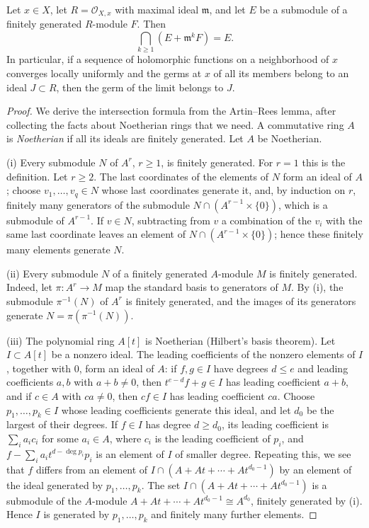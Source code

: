 \begin{lemma}\label{lem:analytic-krull-closure}
Let $x\in X$, let $R=\mathcal O_{X,x}$ with maximal ideal $\mathfrak m$, and let $E$ be a submodule of a finitely generated $R$-module $F$. Then
\[
 \bigcap_{k\geq1}(E+\mathfrak m^kF)=E.
\]
In particular, if a sequence of holomorphic functions on a neighborhood of $x$ converges locally uniformly and the germs at $x$ of all its members belong to an ideal $J\subset R$, then the germ of the limit belongs to $J$.
\end{lemma}
\begin{proof}
We derive the intersection formula from the Artin--Rees lemma, after collecting the facts about Noetherian rings that we need. A commutative ring $A$ is \emph{Noetherian} if all its ideals are finitely generated. Let $A$ be Noetherian.

(i) Every submodule $N$ of $A^r$, $r\geq1$, is finitely generated. For $r=1$ this is the definition. Let $r\geq2$. The last coordinates of the elements of $N$ form an ideal of $A$; choose $v_1,\ldots,v_q\in N$ whose last coordinates generate it, and, by induction on $r$, finitely many generators of the submodule $N\cap(A^{r-1}\times\{0\})$, which is a submodule of $A^{r-1}$. If $v\in N$, subtracting from $v$ a combination of the $v_i$ with the same last coordinate leaves an element of $N\cap(A^{r-1}\times\{0\})$; hence these finitely many elements generate $N$.

(ii) Every submodule $N$ of a finitely generated $A$-module $M$ is finitely generated. Indeed, let $\pi\colon A^r\to M$ map the standard basis to generators of $M$. By (i), the submodule $\pi^{-1}(N)$ of $A^r$ is finitely generated, and the images of its generators generate $N=\pi(\pi^{-1}(N))$.

(iii) The polynomial ring $A[t]$ is Noetherian (Hilbert's basis theorem). Let $I\subset A[t]$ be a nonzero ideal. The leading coefficients of the nonzero elements of $I$, together with $0$, form an ideal of $A$: if $f,g\in I$ have degrees $d\leq e$ and leading coefficients $a,b$ with $a+b\neq0$, then $t^{e-d}f+g\in I$ has leading coefficient $a+b$, and if $c\in A$ with $ca\neq0$, then $cf\in I$ has leading coefficient $ca$. Choose $p_1,\ldots,p_k\in I$ whose leading coefficients generate this ideal, and let $d_0$ be the largest of their degrees. If $f\in I$ has degree $d\geq d_0$, its leading coefficient is $\sum_ia_ic_i$ for some $a_i\in A$, where $c_i$ is the leading coefficient of $p_i$, and $f-\sum_ia_it^{d-\deg p_i}p_i$ is an element of $I$ of smaller degree. Repeating this, we see that $f$ differs from an element of $I\cap(A+At+\cdots+At^{d_0-1})$ by an element of the ideal generated by $p_1,\ldots,p_k$. The set $I\cap(A+At+\cdots+At^{d_0-1})$ is a submodule of the $A$-module $A+At+\cdots+At^{d_0-1}\cong A^{d_0}$, finitely generated by (i). Hence $I$ is generated by $p_1,\ldots,p_k$ and finitely many further elements.


\end{proof}
